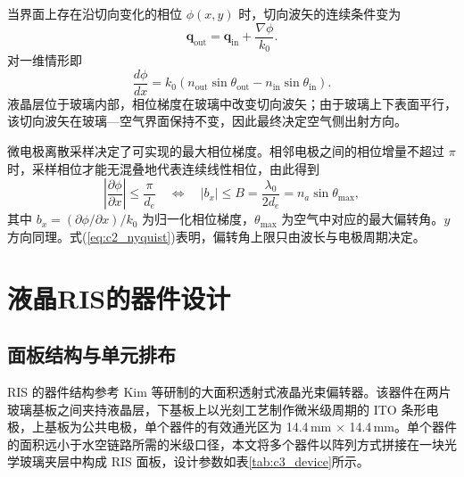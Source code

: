 当界面上存在沿切向变化的相位 $\phi(x,y)$ 时，切向波矢的连续条件变为
\begin{equation}
\mathbf q_{\mathrm{out}}=\mathbf q_{\mathrm{in}}+\frac{\nabla\phi}{k_0}.
\label{eq:c2_gsnell}
\end{equation}
对一维情形即
\begin{equation}
\frac{d\phi}{dx}=k_0\left(n_{\mathrm{out}}\sin\theta_{\mathrm{out}}-n_{\mathrm{in}}\sin\theta_{\mathrm{in}}\right).
\label{eq:c2_gsnell_1d}
\end{equation}
液晶层位于玻璃内部，相位梯度在玻璃中改变切向波矢；由于玻璃上下表面平行，该切向波矢在玻璃—空气界面保持不变，因此最终决定空气侧出射方向。

微电极离散采样决定了可实现的最大相位梯度。相邻电极之间的相位增量不超过 $\pi$ 时，采样相位才能无混叠地代表连续线性相位，由此得到
\begin{equation}
\left|\frac{\partial\phi}{\partial x}\right|\le\frac{\pi}{d_e}
\quad\Longleftrightarrow\quad
|b_x|\le B=\frac{\lambda_0}{2d_e}=n_a\sin\theta_{\max},
\label{eq:c2_nyquist}
\end{equation}
其中 $b_x=(\partial\phi/\partial x)/k_0$ 为归一化相位梯度，$\theta_{\max}$ 为空气中对应的最大偏转角。$y$ 方向同理。式(\ref{eq:c2_nyquist})表明，偏转角上限只由波长与电极周期决定。

\section{液晶RIS的器件设计}
\label{sec:c3_device}

\subsection{面板结构与单元排布}

RIS 的器件结构参考 Kim 等研制的大面积透射式液晶光束偏转器。该器件在两片玻璃基板之间夹持液晶层，下基板上以光刻工艺制作微米级周期的 ITO 条形电极，上基板为公共电极，单个器件的有效通光区为 14.4\,mm $\times$ 14.4\,mm。单个器件的面积远小于水空链路所需的米级口径，本文将多个器件以阵列方式拼接在一块光学玻璃夹层中构成 RIS 面板，设计参数如表\ref{tab:c3_device}所示。

